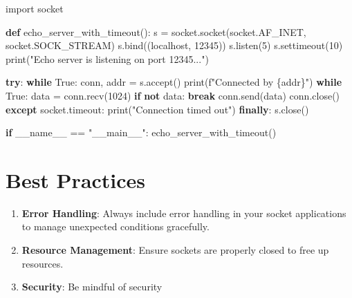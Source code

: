 \documentclass[
  letterpaper,
  DIV=11,
  numbers=noendperiod]{scrreprt}
\newenvironment{Shaded}{\begin{snugshade}}{\end{snugshade}}
\newcommand{\BuiltInTok}[1]{\textcolor[rgb]{0.00,0.23,0.31}{#1}}
\newcommand{\ControlFlowTok}[1]{\textcolor[rgb]{0.00,0.23,0.31}{\textbf{#1}}}
\newcommand{\DecValTok}[1]{\textcolor[rgb]{0.68,0.00,0.00}{#1}}
\newcommand{\ImportTok}[1]{\textcolor[rgb]{0.00,0.46,0.62}{#1}}
\newcommand{\KeywordTok}[1]{\textcolor[rgb]{0.00,0.23,0.31}{\textbf{#1}}}
\newcommand{\NormalTok}[1]{\textcolor[rgb]{0.00,0.23,0.31}{#1}}
\newcommand{\OperatorTok}[1]{\textcolor[rgb]{0.37,0.37,0.37}{#1}}
\newcommand{\SpecialCharTok}[1]{\textcolor[rgb]{0.37,0.37,0.37}{#1}}
\newcommand{\SpecialStringTok}[1]{\textcolor[rgb]{0.13,0.47,0.30}{#1}}
\newcommand{\StringTok}[1]{\textcolor[rgb]{0.13,0.47,0.30}{#1}}
\newcommand{\VariableTok}[1]{\textcolor[rgb]{0.07,0.07,0.07}{#1}}
\providecommand{\tightlist}{%
  \setlength{\itemsep}{0pt}\setlength{\parskip}{0pt}}\usepackage{longtable,booktabs,array}
\begin{document}
\begin{Shaded}
\begin{Highlighting}[]
\ImportTok{import}\NormalTok{ socket}

\KeywordTok{def}\NormalTok{ echo\_server\_with\_timeout():}
\NormalTok{    s }\OperatorTok{=}\NormalTok{ socket.socket(socket.AF\_INET, socket.SOCK\_STREAM)}
\NormalTok{    s.bind((}\StringTok{\textquotesingle{}localhost\textquotesingle{}}\NormalTok{, }\DecValTok{12345}\NormalTok{))}
\NormalTok{    s.listen(}\DecValTok{5}\NormalTok{)}
\NormalTok{    s.settimeout(}\DecValTok{10}\NormalTok{)}
    \BuiltInTok{print}\NormalTok{(}\StringTok{"Echo server is listening on port 12345..."}\NormalTok{)}
    
    \ControlFlowTok{try}\NormalTok{:}
        \ControlFlowTok{while} \VariableTok{True}\NormalTok{:}
\NormalTok{            conn, addr }\OperatorTok{=}\NormalTok{ s.accept()}
            \BuiltInTok{print}\NormalTok{(}\SpecialStringTok{f"Connected by }\SpecialCharTok{\{}\NormalTok{addr}\SpecialCharTok{\}}\SpecialStringTok{"}\NormalTok{)}
            \ControlFlowTok{while} \VariableTok{True}\NormalTok{:}
\NormalTok{                data }\OperatorTok{=}\NormalTok{ conn.recv(}\DecValTok{1024}\NormalTok{)}
                \ControlFlowTok{if} \KeywordTok{not}\NormalTok{ data:}
                    \ControlFlowTok{break}
\NormalTok{                conn.send(data)}
\NormalTok{            conn.close()}
    \ControlFlowTok{except}\NormalTok{ socket.timeout:}
        \BuiltInTok{print}\NormalTok{(}\StringTok{"Connection timed out"}\NormalTok{)}
    \ControlFlowTok{finally}\NormalTok{:}
\NormalTok{        s.close()}

\ControlFlowTok{if} \VariableTok{\_\_name\_\_} \OperatorTok{==} \StringTok{"\_\_main\_\_"}\NormalTok{:}
\NormalTok{    echo\_server\_with\_timeout()}
\end{Highlighting}
\end{Shaded}

\section{Best Practices}\label{best-practices-1}

\begin{enumerate}
\def\labelenumi{\arabic{enumi}.}
\tightlist
\item
  \textbf{Error Handling}: Always include error handling in your socket
  applications to manage unexpected conditions gracefully.
\item
  \textbf{Resource Management}: Ensure sockets are properly closed to
  free up resources.
\item
  \textbf{Security}: Be mindful of security
\end{enumerate}
\end{document}
